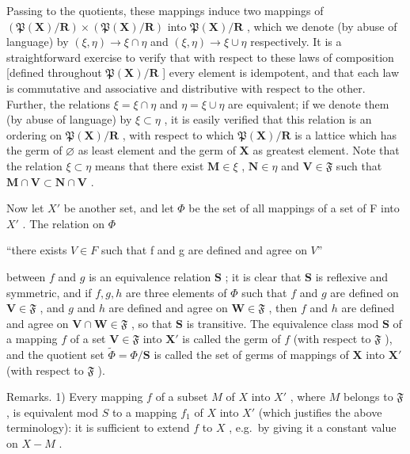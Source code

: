 Passing to the quotients, these mappings induce two mappings of \((\mathfrak{P}(\mathbf{X}) / \mathbf{R}) \times (\mathfrak{P}(\mathbf{X}) / \mathbf{R})\) into \(\mathfrak{P}(\mathbf{X}) / \mathbf{R}\) , which we denote (by abuse of language) by \((\xi, \eta) \to \xi \cap \eta\) and \((\xi, \eta) \to \xi \cup \eta\) respectively. It is a straightforward exercise to verify that with respect to these laws of composition {[}defined throughout \(\mathfrak{P}(\mathbf{X}) / \mathbf{R}\) {]} every element is idempotent, and that each law is commutative and associative and distributive with respect to the other. Further, the relations \(\xi = \xi \cap \eta\) and \(\eta = \xi \cup \eta\) are equivalent; if we denote them (by abuse of language) by \(\xi \subset \eta\) , it is easily verified that this relation is an ordering on \(\mathfrak{P}(\mathbf{X}) / \mathbf{R}\) , with respect to which \(\mathfrak{P}(\mathbf{X}) / \mathbf{R}\) is a lattice which has the germ of \(\varnothing\) as least element and the germ of \(\mathbf{X}\) as greatest element. Note that the relation \(\xi \subset \eta\) means that there exist \(\mathbf{M} \in \xi\) , \(\mathbf{N} \in \eta\) and \(\mathbf{V} \in \mathfrak{F}\) such that \(\mathbf{M} \cap \mathbf{V} \subset \mathbf{N} \cap \mathbf{V}\) .

Now let \(X'\) be another set, and let \(\Phi\) be the set of all mappings of a set of F into \(X'\) . The relation on \(\Phi\)

``there exists \(V \in F\) such that f and g are defined and agree on \(V\)''

between \(f\) and \(g\) is an equivalence relation \(\mathbf{S}\) ; it is clear that \(\mathbf{S}\) is reflexive and symmetric, and if \(f, g, h\) are three elements of \(\Phi\) such that \(f\) and \(g\) are defined on \(\mathbf{V} \in \mathfrak{F}\) , and \(g\) and \(h\) are defined and agree on \(\mathbf{W} \in \mathfrak{F}\) , then \(f\) and \(h\) are defined and agree on \(\mathbf{V} \cap \mathbf{W} \in \mathfrak{F}\) , so that \(\mathbf{S}\) is transitive. The equivalence class mod \(\mathbf{S}\) of a mapping \(f\) of a set \(\mathbf{V} \in \mathfrak{F}\) into \(\mathbf{X}'\) is called the germ of \(f\) (with respect to \(\mathfrak{F}\) ), and the quotient set \(\tilde{\Phi} = \Phi / \mathbf{S}\) is called the set of germs of mappings of \(\mathbf{X}\) into \(\mathbf{X}'\) (with respect to \(\mathfrak{F}\) ).

Remarks. 1) Every mapping \(f\) of a subset \(M\) of \(X\) into \(X'\) , where \(M\) belongs to \(\mathfrak{F}\) , is equivalent mod \(S\) to a mapping \(f_1\) of \(X\) into \(X'\) (which justifies the above terminology): it is sufficient to extend \(f\) to \(X\) , e.g.~by giving it a constant value on \(X - M\) .


